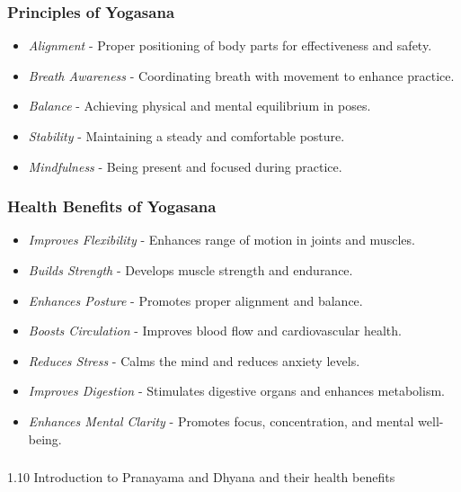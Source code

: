 \begin{frame}[fragile]\frametitle{Principles of Yogasana}

      \begin{itemize}
		\item \textit{Alignment} - Proper positioning of body parts for effectiveness and safety.
		\item \textit{Breath Awareness} - Coordinating breath with movement to enhance practice.
		\item \textit{Balance} - Achieving physical and mental equilibrium in poses.
		\item \textit{Stability} - Maintaining a steady and comfortable posture.
		\item \textit{Mindfulness} - Being present and focused during practice.
	  \end{itemize}

\end{frame}

\begin{frame}[fragile]\frametitle{Health Benefits of Yogasana}

      \begin{itemize}
		\item \textit{Improves Flexibility} - Enhances range of motion in joints and muscles.
		\item \textit{Builds Strength} - Develops muscle strength and endurance.
		\item \textit{Enhances Posture} - Promotes proper alignment and balance.
		\item \textit{Boosts Circulation} - Improves blood flow and cardiovascular health.
		\item \textit{Reduces Stress} - Calms the mind and reduces anxiety levels.
		\item \textit{Improves Digestion} - Stimulates digestive organs and enhances metabolism.
		\item \textit{Enhances Mental Clarity} - Promotes focus, concentration, and mental well-being.
	  \end{itemize}

\end{frame}



\begin{frame}[fragile]\frametitle{}
\begin{center}
{\Large 1.10 Introduction to Pranayama and Dhyana and their health benefits}
\end{center}
\end{frame}

